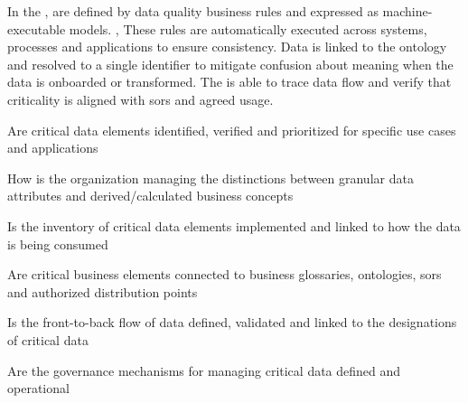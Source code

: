 %
%

\ekgmmCapabilitySectionContributionToEnterprise

In the ,  are defined by data quality business rules
and expressed as machine-executable models.
,
These rules are automatically executed across systems, processes and applications to ensure consistency.
Data is linked to the ontology and resolved to a single identifier to mitigate confusion about meaning when the
data is onboarded or transformed.
The  is able to trace data flow and verify that criticality is aligned with \glspl{sor}
and agreed usage.

\ekgmmCapabilitySectionDimensions

\begin{core-questions}

  \item [\thesection.1] Are critical data elements identified, verified and prioritized for specific
                        use cases and applications
  \item [\thesection.2] How is the organization managing the distinctions between granular data attributes and
                        derived/calculated business concepts
  \item [\thesection.3] Is the inventory of critical data elements implemented and linked to how the
                        data is being consumed
  \item [\thesection.4] Are critical business elements connected to business glossaries, ontologies,
                        \glspl{sor} and authorized distribution points
  \item [\thesection.5] Is the front-to-back flow of data defined, validated and linked to the designations of
                        critical data
  \item [\thesection.6] Are the governance mechanisms for managing critical data defined and operational

\end{core-questions}

